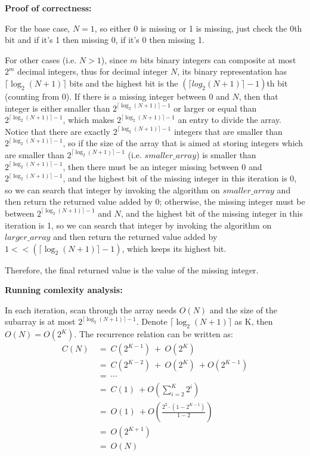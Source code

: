 \documentclass{article}
\begin{document}
{\par\textbf{Proof of correctness: }
\par For the base case, $N=1$, so either 0 is missing or 1 is missing, just check the $0$th bit and if it's 1 then missing 0, if it's 0 then missing 1.
\par For other cases (i.e. $N>1$), since $m$ bits binary integers can composite at most $2^m$ decimal integers, thus for decimal integer $N$, its binary representation has $\lceil\log_2{(N+1)}\rceil$ bits and the highest bit is the $(\lceil log_2{(N+1)}\rceil-1)$th bit (counting from 0). If there is a missing integer between 0 and $N$, then that integer is either smaller than $2^{\lceil \log_2{(N+1)}\rceil-1}$ or larger or equal than $2^{\lceil \log_2{(N+1)}\rceil-1}$, which makes $2^{\lceil \log_2{(N+1)}\rceil-1}$ an entry to divide the array. Notice that there are exactly $2^{\lceil \log_2{(N+1)}\rceil-1}$ integers that are smaller than $2^{\lceil \log_2{(N+1)}\rceil-1}$, so if the size of the array that is aimed at storing integers which are smaller than $2^{\lceil \log_2{(N+1)}\rceil-1}$ (i.e. $smaller\_array$) is smaller than $2^{\lceil \log_2{(N+1)}\rceil-1}$, then there must be an integer missing between 0 and $2^{\lceil \log_2{(N+1)}\rceil-1}$, and the highest bit of the missing integer in this iteration is 0, so we can search that integer by invoking the algorithm on $smaller\_array$ and then return the returned value added by 0; otherwise, the missing integer must be between $2^{\lceil \log_2{(N+1)}\rceil-1}$ and $N$, and the highest bit of the missing integer in this iteration is 1, so we can search that integer by invoking the algorithm on $larger\_array$ and then return the returned value added by $1<<(\lceil \log_2{(N+1)}\rceil-1)$, which keeps its highest bit.
\par Therefore, the final returned value is the value of the missing integer.\\

\par\textbf{Running comlexity analysis: }
\par In each iteration, scan through the array needs $O(N)$ and the size of the subarray is at most $2^{\lceil \log_2{(N+1)}\rceil-1}$. Denote $\lceil \log_2{(N+1)}\rceil$ as K, then $O(N) = O(2^K)$. The recurrence relation can be written as:
\begin{align*}
	C(N)\ &=\ C(2^{K-1})\ +\ O(2^K)\\
	      &=\ C(2^{K-2})\ +\ O(2^K)\ + O(2^{K-1})\\
	      &=\ \cdots\\
	      &=\ C(1)\ + O(\sum_{i=2}^{K}2^i)\\
	      &=\ O(1)\ + O(\frac{2^2\cdot(1-2^{K-1})}{1-2})\\
	      &=\ O(2^{K+1})\\
	      &=\ O(N)
\end{align*}
}
\pagebreak
\end{document}
